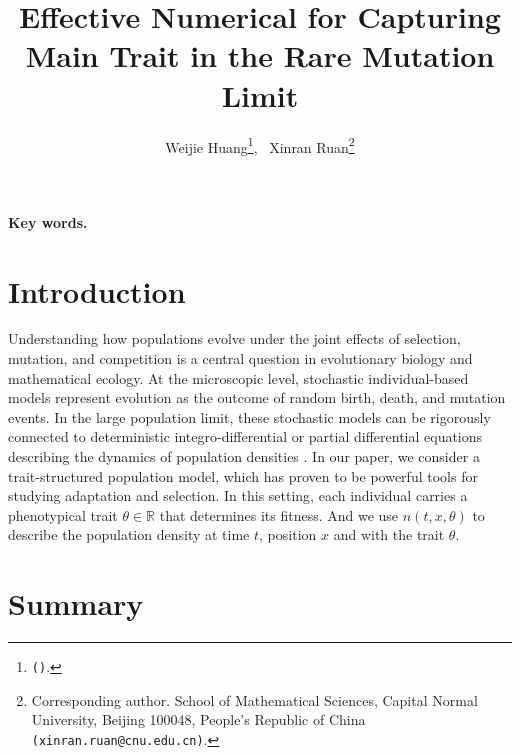 \documentclass[11pt, dina4, amsfont12]{article}
\title{Effective Numerical for Capturing Main Trait in the Rare Mutation Limit}
\author{
Weijie Huang\thanks{{\tt ()}.}, \ 
Xinran Ruan\thanks{Corresponding author. School of Mathematical Sciences, Capital Normal University, Beijing 100048, People’s Republic of China {\tt (xinran.ruan@cnu.edu.cn)}.} 
}
\begin{document}
\date{}
\maketitle

\begin{abstract}

\end{abstract}

{\bf Key words. }  

\section{Introduction}
\label{section1}
Understanding how populations evolve under the joint effects of selection, mutation, and competition is a central question in evolutionary biology and mathematical ecology.
At the microscopic level, stochastic individual-based models represent evolution as the outcome of random birth, death, and mutation events.
In the large population limit, these stochastic models can be rigorously connected to deterministic integro-differential or partial differential equations describing the dynamics of population densities \cite{}.
In our paper,  we consider a trait-structured population model, which has proven to be powerful tools for studying adaptation and selection.
In this setting, each individual carries a phenotypical trait $\theta\in \mathbb{R}$ that determines its fitness. 
And we use $n(t, x, \theta)$ to describe the population density at time $t$, position $x$ and with the trait $\theta$. 
 





\section{Summary}
\label{section6}
\end{document}
